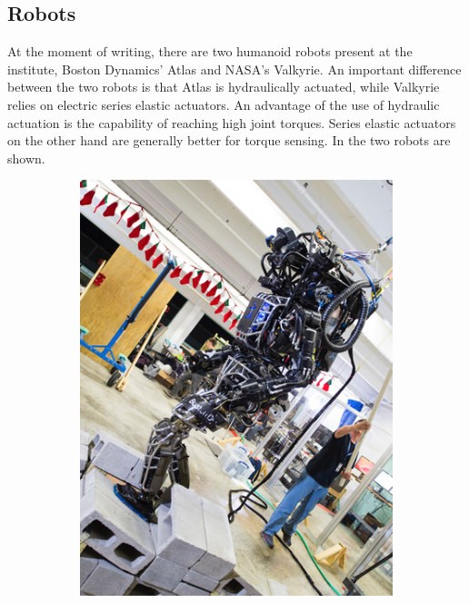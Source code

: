 \subsection{Robots}
At the moment of writing, there are two humanoid robots present at the institute, Boston Dynamics' Atlas and NASA's Valkyrie. An important difference between the two robots is that Atlas is hydraulically actuated, while Valkyrie relies on electric series elastic actuators. An advantage of the use of hydraulic actuation is the capability of reaching high joint torques. Series elastic actuators on the other hand are generally better for torque sensing. In  the two robots are shown.
\begin{figure}[h]
\centering
  \begin{subfigure}{0.45\textwidth}
  \centering
  \includegraphics[width=.8\linewidth]{STYLESTUFF/AtlasOld.png}
   \caption{}
    \label{fig:atlas}
  \end{subfigure}
  \begin{subfigure}{0.45\textwidth}
    \centering

\end{subfigure}
\end{figure}
